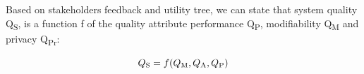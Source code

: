 \documentclass[10pt, conference]{IEEEtran}
\begin{document}

Based on stakeholders feedback and utility tree, we can state that system quality Q\textsubscript{S}, is a function f of the quality attribute performance Q\textsubscript{P}, modifiability Q\textsubscript{M} and privacy Q\textsubscript{Pr}:

\begin{equation}
    Q\textsubscript{S} = f(Q\textsubscript{M}, Q\textsubscript{A}, Q\textsubscript{P})
\end{equation}
\end{document}
